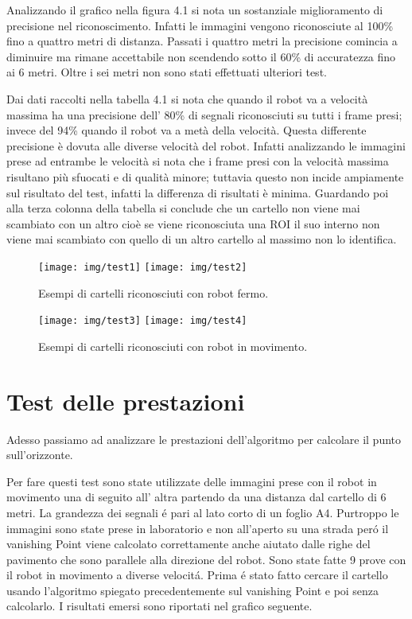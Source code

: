 	Analizzando il grafico nella figura 4.1 si nota un sostanziale miglioramento di precisione nel riconoscimento. Infatti le immagini vengono riconosciute al 100\% fino a quattro metri di distanza. Passati i quattro metri la precisione comincia a diminuire ma rimane accettabile non scendendo sotto il 60\%  di accuratezza fino ai 6 metri. Oltre i sei metri non sono stati effettuati ulteriori test.

	Dai dati raccolti nella tabella 4.1 si nota che quando il robot va a velocità massima ha una precisione dell' 80\% di segnali riconosciuti su tutti i frame presi; invece del 94\% quando il robot va a metà della velocità. Questa differente precisione è dovuta alle diverse velocità del robot. Infatti analizzando le immagini prese ad entrambe le velocità si nota che i frame presi con la velocità massima risultano più sfuocati e di qualità minore; tuttavia questo non incide ampiamente sul risultato del test, infatti la differenza di risultati è minima. Guardando poi alla terza colonna della tabella si conclude che un cartello non viene mai scambiato con un altro cioè se viene riconosciuta una ROI il suo interno non viene mai scambiato con quello di un altro cartello al massimo non lo identifica.

	\begin{figure}[!ht]
		\centering
		\texttt{[image: img/test1]}
		\texttt{[image: img/test2]}
		\caption[Riconoscimento immagini robot fermo]{Esempi di cartelli riconosciuti con robot fermo.}
	\end{figure}

	\begin{figure}[!ht]
		\centering
		\texttt{[image: img/test3]}
		\texttt{[image: img/test4]}
		\caption[Riconoscimento immagini robot in movimento]{Esempi di cartelli riconosciuti con robot in movimento.}
	\end{figure}

\section{Test delle prestazioni}

	Adesso passiamo ad analizzare le prestazioni dell'algoritmo per calcolare il punto sull'orizzonte.

	Per fare questi test sono state utilizzate delle immagini prese con il robot in movimento una di seguito all' altra partendo da una distanza dal cartello di 6 metri. La grandezza dei segnali \'e pari al lato corto di un foglio A4. Purtroppo le immagini sono state prese in laboratorio e non all'aperto su una strada per\'o il vanishing Point viene calcolato correttamente anche aiutato dalle righe del pavimento che sono parallele alla direzione del robot. Sono state fatte 9 prove con il robot in movimento a diverse velocit\'a. Prima \'e stato fatto cercare il cartello usando l'algoritmo spiegato precedentemente sul vanishing Point e poi senza calcolarlo. I risultati emersi sono riportati nel grafico seguente.

